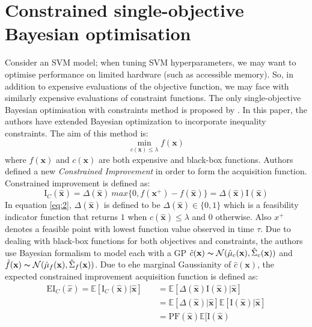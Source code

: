 \section{Constrained single-objective Bayesian optimisation}
Consider an SVM model; when tuning SVM hyperparameters, we may want to optimise performance on limited hardware (such as accessible memory). So, in addition to expensive evaluations of the objective function, we may face with similarly expensive evaluations of constraint functions. The only single-objective Bayesian optimisation with constraints method is proposed by \cite{gardner2014bayesian}. In this paper, the authors have extended Bayesian optimization to incorporate inequality constraints. The aim of this method is:
\begin{equation}
\operatorname*{min}_{c(\textbf{x}) \leq \lambda} f(\textbf{x})	
\label{eq:1}
\end{equation}
where $f(\textbf{x})$ and $c(\textbf{x})$ are both expensive and black-box functions. Authors defined a new \textit{Constrained Improvement} in order to form the acquisition function. Constrained improvement is defined as:
\begin{equation}
\mathrm{I}_C(\hat{\textbf{x}}) = \Delta(\hat{\textbf{x}})\ max\{0,f(\textbf{x}^{+})-f(\hat{\textbf{x}})\} = \Delta(\hat{\textbf{x}})\mathrm{I}(\hat{\textbf{x}})
\label{eq:2}
\end{equation}
In equation \ref{eq:2}, $\Delta(\hat{\textbf{x}})$ is defined to be $\Delta(\hat{\textbf{x}}) \in \{0,1\}$ which is a feasibility indicator function that returns $1$ when $c(\hat{\textbf{x}}) \leq \lambda$ and $0$ otherwise. Also $x^+$ denotes a feasible point with lowest function value observed in time $\tau$. Due to dealing with black-box functions for both objectives and constraints, the authors use Bayesian formalism to model each with a GP $\hat{c}(\textbf{x}) \thicksim
 \mathcal{N}(\hat{\mu}_{c}(\textbf{x}),\hat{\Sigma}_c(\textbf{x}))$ and $\hat{f}(\textbf{x}) \thicksim \mathcal{N}(\hat{\mu}_{f}(\textbf{x}),\hat{\Sigma}_f(\textbf{x}))$.
Due to ehe marginal Gaussianity of $\hat{c}(\textbf{x})$, the expected constrained improvement acquisition function is defined as:
\begin{equation}
\begin{split}
\mathrm{EI}_C(\hat{x}) = \mathbb{E}[\mathrm{I}_C(\hat{\textbf{x}})|\hat{\textbf{x}}]
		     		  & \quad = \mathbb{E}[\Delta(\hat{\textbf{x}})\mathrm{I}(\hat{\textbf{x}})|\hat{\textbf{x}}]\\
					  & \quad = \mathbb{E}[\Delta(\hat{\textbf{x}})|\hat{\textbf{x}}]\mathbb{E}[\mathrm{I}(\hat{\textbf{x}})|\hat{\textbf{x}}]\\
   					  & \quad = \mathrm{PF}(\hat{\textbf{x}})\mathbb{E}[\mathrm{I}(\hat{\textbf{x}})
\end{split}
\label{eq:3}
\end{equation}
